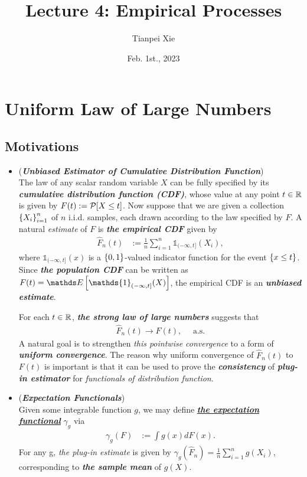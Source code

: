 \documentclass[11pt]{article}
\begin{document}
\title{Lecture 4: Empirical Processes}
\author{ Tianpei Xie}
\date{Feb. 1st., 2023}
\maketitle
\tableofcontents
\newpage
\section{Uniform Law of Large Numbers}
\subsection{Motivations}
\begin{itemize}
\item \begin{remark}(\textbf{\emph{Unbiased Estimator of Cumulative Distribution Function}})\\
The law of any scalar random variable $X$ can be fully specified by its \emph{\textbf{cumulative distribution function (CDF)}}, whose value at any point $t \in {\mathbb R}$ is given by $F(t) := {\mathcal P}[X \le t]$. Now suppose that we are given a collection $\left\{X_i\right\}^{n}_{i=1}$ of $n$ i.i.d. samples, each drawn according to the law specified by $F$. A natural \emph{estimate} of $F$ is \emph{\textbf{the empirical CDF}} given by
\begin{align}
\widehat{F}_n(t) &:=\frac{1}{n}\sum^{n}_{i=1}\mathds{1}_{(-\infty, t]}(X_i),\label{def: empirical_cdf}
\end{align} where $\mathds{1}_{(-\infty, t]}(x)$ is a $\left\{0, 1\right\}$-valued indicator function for the event $\left\{x \le t\right\}$. Since \emph{\textbf{the population CDF}} can be written as $F(t) = \E{}{\mathds{1}_{(-\infty, t]}(X)}$, the empirical CDF is an \emph{\textbf{unbiased estimate}}.

For each $t \in {\mathbb R}$, \emph{\textbf{the strong law of large numbers}} suggests that 
\begin{align*}
\widehat{F}_n(t) \rightarrow F(t), \quad \text{ a.s.}
\end{align*} A natural goal is to strengthen\emph{ this pointwise convergence} to a form of \emph{\textbf{uniform convergence}}. The reason why uniform convergence of $\widehat{F}_n(t)$ to $F(t)$ is important is that it can be used to prove the \emph{\textbf{consistency}} of \emph{\textbf{plug-in estimator}} for \emph{functionals of distribution function}.
\end{remark}

\item \begin{example} (\textbf{\emph{Expectation Functionals}}) \\
Given some integrable function $g$, we may define \underline{\textbf{\emph{the expectation functional}}} $\gamma_g$ via
\begin{align}
\gamma_{g}(F) &:= \int g(x) dF(x). \label{def: exp_functional}
\end{align} For any g, \emph{the plug-in estimate} is given by $\gamma_g(\widehat{F}_n) = \frac{1}{n}\sum^{n}_{i=1}g(X_i)$, corresponding to \emph{\textbf{the sample mean}} of $g(X)$. 
\end{example}


\end{itemize}
\end{document}
